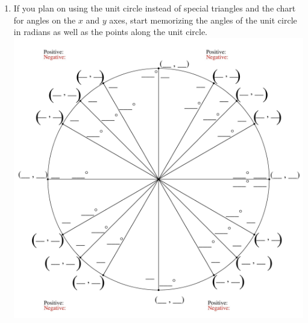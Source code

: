 \begin{enumerate}
\item If you plan on using the unit circle instead of special triangles and the chart for angles on the $x$ and $y$ axes, start memorizing the angles of the unit circle in radians as well as the points along the unit circle.\\
\includegraphics[scale=.6]{blankunitcircle}
\end{enumerate}

